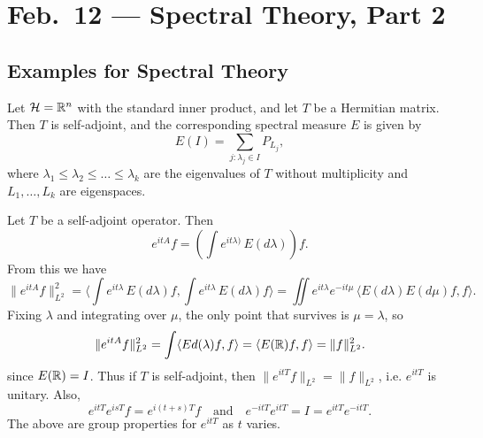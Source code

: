 \chapter{Feb.~12 --- Spectral Theory, Part 2}

\section{Examples for Spectral Theory}

\begin{example}
  Let $\mathcal{H} = \mathbb{R}^n$ with the standard inner product, and
  let $T$ be a Hermitian matrix. Then $T$ is self-adjoint, and
  the corresponding spectral measure $E$ is given by
  \[
    E(I) = \sum_{j : \lambda_j \in I} P_{L_j},
  \]
  where $\lambda_1 \le \lambda_2 \le \dots \le \lambda_k$ are 
  the eigenvalues of $T$ without multiplicity and
  $L_1, \dots, L_k$ are eigenspaces.
\end{example}

\begin{example}
  Let $T$ be a self-adjoint operator. Then
  \[
    e^{itA} f = \left(\int e^{it\lambda)}\, E(d\lambda)\right) f.
  \]
  From this we have
  \[
    \|e^{itA} f\|_{L^2}^2
    = \langle \int e^{it\lambda}\, E(d\lambda) f, \int e^{it\lambda}\, E(d\lambda) f\rangle
    = \iint e^{it \lambda} e^{-it\mu}\, \langle E(d\lambda) E(d\mu) f, f \rangle.
  \]
  Fixing $\lambda$ and integrating over $\mu$, the
  only point that survives is $\mu = \lambda$, so
  \[
    \|e^{itA} f\|_{L^2}^2
    = \int \langle Ed(\lambda) f, f \rangle
    = \langle E(\mathbb{R}) f, f \rangle
    = \|f\|_{L^2}^2.
  \]
  since $E(\mathbb{R}) = I$. Thus if $T$ is self-adjoint, then
  $\|e^{itT} f\|_{L^2} = \|f\|_{L^2}$, i.e. $e^{itT}$ is
  unitary. Also,
  \[
    e^{itT} e^{isT} f = e^{i(t+s)T} f \quad \text{and} \quad
    e^{-itT} e^{itT} = I = e^{itT} e^{-itT}.
  \]
  The above are group properties for $e^{itT}$ as
  $t$ varies.
\end{example}

